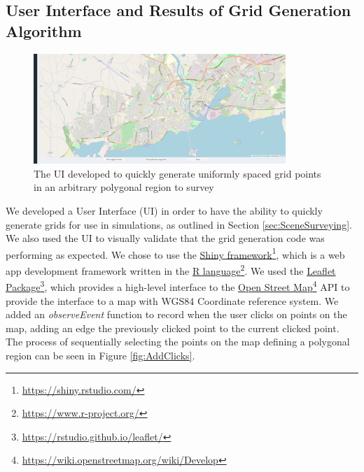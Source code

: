 \subsection{User Interface and Results of Grid Generation Algorithm}\label{subsec:SceneSurveyingUI}
\begin{figure}[h]
\centering
\includegraphics[width=0.85\textwidth]{Chapters/MultiAgentCoverage/Figs/ShinyUI/UIWithButtons.PNG}
\caption{The UI developed to quickly generate uniformly spaced grid points in an arbitrary polygonal region to survey}
\label{fig:SceneSurveyingUI}
\end{figure}
We developed a User Interface (UI) in order to have the ability to quickly generate grids for use in simulations, as outlined in Section \ref{sec:SceneSurveying}. We also used the UI to visually validate that the grid generation code was performing as expected. We chose to use the  \href{https://shiny.rstudio.com/}{Shiny framework}\footnote{\href {https://shiny.rstudio.com/}{https://shiny.rstudio.com/}}, which is a web app development framework written in the \href{https://www.r-project.org/}{R language}\footnote{\href {https://www.r-project.org/}{https://www.r-project.org/}}.
We used the \href{https://rstudio.github.io/leaflet/}{Leaflet Package}\footnote{\href {https://rstudio.github.io/leaflet/}{https://rstudio.github.io/leaflet/}}, which provides a high-level interface to the \href{https://wiki.openstreetmap.org/wiki/Develop}{Open Street Map}\footnote{\href {https://wiki.openstreetmap.org/wiki/Develop}{https://wiki.openstreetmap.org/wiki/Develop}} API to provide the interface to a map with WGS84 Coordinate reference system. We added an \textit{observeEvent} function to record when the user clicks on points on the map, adding an edge the previously clicked point to the current clicked point. The process of sequentially selecting the points on the map defining a polygonal region can be seen in Figure \ref{fig:AddClicks}. 

